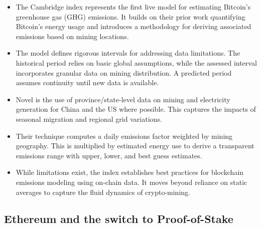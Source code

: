 \documentclass{article}
\begin{document}
\begin{itemize}
    \item The Cambridge index represents the first live model for estimating Bitcoin's greenhouse gas (GHG) emissions. It builds on their prior work quantifying Bitcoin's energy usage and introduces a methodology for deriving associated emissions based on mining locations.
    \item The model defines rigorous intervals for addressing data limitations. The historical period relies on basic global assumptions, while the assessed interval incorporates granular data on mining distribution. A predicted period assumes continuity until new data is available.
    \item Novel is the use of province/state-level data on mining and electricity generation for China and the US where possible. This captures the impacts of seasonal migration and regional grid variations.
    \item Their technique computes a daily emissions factor weighted by mining geography. This is multiplied by estimated energy use to derive a transparent emissions range with upper, lower, and best guess estimates.
    \item While limitations exist, the index establishes best practices for blockchain emissions modeling using on-chain data. It moves beyond reliance on static averages to capture the fluid dynamics of crypto-mining.
\end{itemize}

\subsection{Ethereum and the switch to Proof-of-Stake}
\end{document}
